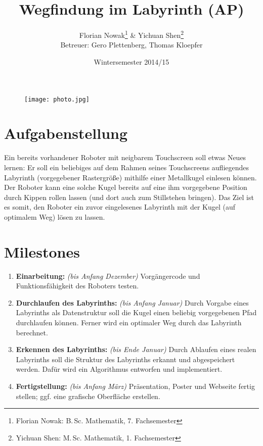 \documentclass[ngerman]{scrartcl}
\title{Wegfindung im Labyrinth (AP)}
\author{
    Florian Nowak\footnote{Florian Nowak: B.\,Sc. Mathematik, 7. Fachsemester}\; \& Yichuan Shen\footnote{Yichuan Shen: M.\,Sc. Mathematik, 1. Fachsemester}\\
    Betreuer: Gero Plettenberg, Thomas Kloepfer
}
\date{Wintersemester 2014/15}
\begin{document}

\maketitle

\begin{figure}[h]
    \centering
    \texttt{[image: photo.jpg]}
\end{figure}

\section*{Aufgabenstellung}

Ein bereits vorhandener Roboter mit neigbarem Touchscreen soll etwas Neues lernen: Er soll ein beliebiges auf dem Rahmen seines Touchscreens aufliegendes Labyrinth (vorgegebener Rastergröße) mithilfe einer Metallkugel einlesen können. Der Roboter kann eine solche Kugel bereits auf eine ihm vorgegebene Position durch Kippen rollen lassen (und dort auch zum Stillstehen bringen). Das Ziel ist es somit, den Roboter ein zuvor eingelesenes Labyrinth mit der Kugel (auf optimalem Weg) lösen zu lassen.

\section*{Milestones}
\begin{enumerate}
    \item \textbf{Einarbeitung:} \textit{(bis Anfang Dezember)} Vorgängercode und Funktionsfähigkeit des Roboters testen.
    \item \textbf{Durchlaufen des Labyrinths:} \textit{(bis Anfang Januar)} Durch Vorgabe eines Labyrinths als Datenstruktur soll die Kugel einen beliebig vorgegebenen Pfad durchlaufen können. Ferner wird ein optimaler Weg durch das Labyrinth berechnet.
    \item \textbf{Erkennen des Labyrinths:} \textit{(bis Ende Januar)} Durch Ablaufen eines realen Labyrinths soll die Struktur des Labyrinths erkannt und abgespeichert werden. Dafür wird ein Algorithmus entworfen und implementiert.
    \item \textbf{Fertigstellung:} \textit{(bis Anfang März)} Präsentation, Poster und Webseite fertig stellen; ggf. eine grafische Oberfläche erstellen.
\end{enumerate}
\end{document}
